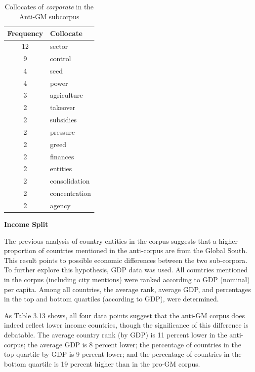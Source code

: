 \begin{table}[H]
\begin{footnotesize}
\centering
\def\arraystretch{1.1}%
\begin{tabular}{ | m{2cm} | m{2.25cm} |}  
\hline
\textbf{Frequency} & \textbf{Collocate} \\
\hline
\multicolumn{1}{|c|}{12} & sector \\
\hline
\multicolumn{1}{|c|}{9} & control \\
\hline
\multicolumn{1}{|c|}{4} & seed \\
\hline
\multicolumn{1}{|c|}{4} & power \\
\hline
\multicolumn{1}{|c|}{3} & agriculture \\
\hline
\multicolumn{1}{|c|}{2} & takeover \\ 
\hline
\multicolumn{1}{|c|}{2} & subsidies \\
\hline
\multicolumn{1}{|c|}{2} & pressure \\
\hline
\multicolumn{1}{|c|}{2} & greed \\
\hline
\multicolumn{1}{|c|}{2} & finances \\
\hline
\multicolumn{1}{|c|}{2} & entities \\
\hline
\multicolumn{1}{|c|}{2} & consolidation \\
\hline
\multicolumn{1}{|c|}{2} & concentration \\
\hline
\multicolumn{1}{|c|}{2} & agency \\
\hline
\end{tabular}
\caption{Collocates of \textit{corporate} in the Anti-GM subcorpus}
\label{tab:table1}
\end{footnotesize}
\end{table}

\textbf{Income Split}

The previous analysis of country entities in the corpus suggests that a higher proportion of countries mentioned in the anti-corpus are from the Global South. This result points to possible economic differences between the two sub-corpora. To further explore this hypothesis, GDP data was used. All countries mentioned in the corpus (including city mentions) were ranked according to GDP (nominal) per capita. Among all countries, the average rank, average GDP, and percentages in the top and bottom quartiles (according to GDP), were determined. 

As Table 3.13 shows, all four data points suggest that the anti-GM corpus does indeed reflect lower income countries, though the significance of this difference is debatable. The average country rank (by GDP) is 11 percent lower in the anti-corpus; the average GDP is 8 percent lower; the percentage of countries in the top quartile by GDP is 9 percent lower; and the percentage of countries in the bottom quartile is 19 percent higher than in the pro-GM corpus. 

